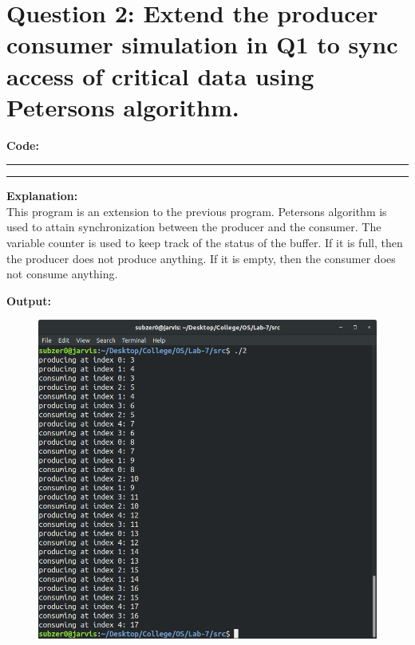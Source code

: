 \documentclass{article}
\begin{document}
\section*{Question 2: Extend the producer consumer simulation in Q1 to sync access of critical data using Petersons algorithm.}
\bigskip

\par\noindent
\textbf{\Large Code: }
\smallskip
\par\noindent\rule{\textwidth}{0.4pt}

\par\noindent\rule{\textwidth}{0.4pt}

\bigskip
\noindent
\textbf{\Large Explanation: } \\

This program is an extension to the previous program. Petersons algorithm is used to attain
synchronization between the producer and the consumer. The variable counter is used to keep
track of the status of the buffer. If it is full, then the producer does not produce anything.
If it is empty, then the consumer does not consume anything.


\bigskip
\noindent
\textbf{\Large Output:}

\begin{figure}[h]
	\includegraphics[width=\textwidth]{output/2.png}
\end{figure}
\bigskip
\pagebreak
\end{document}

